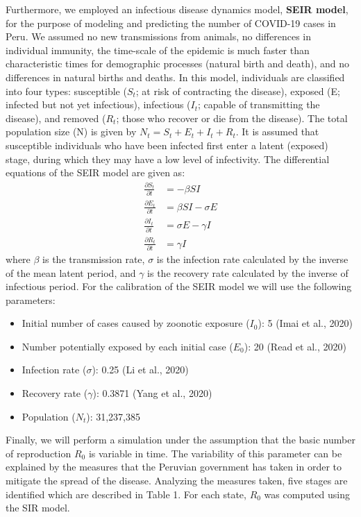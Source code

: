 \documentclass[12pt]{article}
\begin{document}
Furthermore, we employed an infectious disease dynamics model, \textbf{SEIR model}, for the purpose of modeling and predicting the number of COVID-19 cases in Peru. We assumed no new transmissions from animals, no differences in individual immunity, the time-scale of the epidemic is much faster than characteristic times for demographic processes (natural birth and death), and no differences in natural births and deaths. In this model, individuals are classified into four types: susceptible ($S_t$; at risk of contracting the disease), exposed (E; infected but not yet infectious), infectious ($I_t$; capable of transmitting the disease), and removed ($R_t$; those who recover or die from the disease). The total population size (N) is given by $N_t = S_t + E_t + I_t + R_t$. It is assumed that susceptible individuals who have been infected first enter a latent (exposed) stage, during which they may have a low level of infectivity. The differential equations of the SEIR model are given as:
\begin{equation}
\begin{split}
\frac{\partial S_t}{\partial t}&=-\beta SI \\[1ex]
\frac{\partial E_t}{\partial t}&=\beta SI-\sigma E \\[1ex]
\frac{\partial I_t}{\partial t}&=\sigma E-\gamma I \\[1ex]
\frac{\partial R_t}{\partial t}&=\gamma I 
\end{split}
\end{equation}
where $\beta$ is the transmission rate, $\sigma$ is the infection rate calculated by the inverse of the mean latent period, and $\gamma$ is the recovery rate calculated by the inverse of infectious period. For the calibration of the SEIR model we will use the following parameters:
\begin{itemize}
\setlength\itemsep{0.01em}
\item Initial number of cases caused by zoonotic exposure ($I_0$): 5 (Imai et al., 2020)
\item Number potentially exposed by each initial case ($E_0$): 20 (Read et al., 2020)
\item Infection rate ($\sigma$): 0.25 (Li et al., 2020)
\item Recovery rate ($\gamma$): 0.3871 (Yang et al., 2020)
\item Population ($N_t$): 31,237,385
\end{itemize}

Finally, we will perform a simulation under the assumption that the basic number of reproduction $R_0$ is variable in time. The variability of this parameter can be explained by the measures that the Peruvian government has taken in order to mitigate the spread of the disease. Analyzing the measures taken, five stages are identified which are described in Table 1. For each state, $R_0$ was computed using the SIR model.
\end{document}
